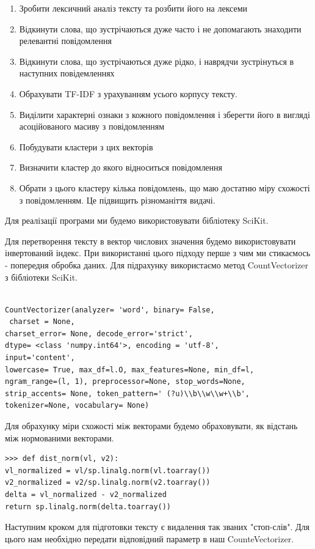 \documentclass[a4paper,14pt,russian]{extreport}
\begin{document}
\begin{enumerate}
\item Зробити лексичний аналіз тексту та розбити його на лексеми
\item Відкинути слова, що зустрічаються дуже часто і не допомагають знаходити релевантні повідомлення
\item Відкинути слова, що зустрічаються дуже рідко, і наврядчи зустрінуться в наступних повідемленнях
\item Обрахувати  TF-IDF з урахуванням усього корпусу тексту.
\item Виділити характерні ознаки з кожного повідомлення і зберегти його в вигляді асоційованого масиву з повідомленням 
\item Побудувати кластери з цих векторів
\item Визначити кластер до якого відноситься повідомлення
\item Обрати з цього кластеру кілька повідомлень, що маю достатню міру схожості з повідомленням. Це підвищить різноманіття видачі.
\end{enumerate}

Для реалізації програми ми будемо використовувати бібліотеку SciKit.

\par 
Для перетворення тексту в вектор числових значення будемо використовувати  інвертований індекс. При використанні цього підходу перше з чим ми стикаємось -  попередня обробка даних. Для підрахунку використаємо метод CountVectorizer з бібліотеки SciKit. 

\begin{lstlisting}[frame=single]  % Start your code-block

CountVectorizer(analyzer= 'word', binary= False,
 charset = None,
charset_error= None, decode_error='strict',
dtype= <class 'numpy.int64'>, encoding = 'utf-8',
input='content',
lowercase= True, max_df=l.O, max_features=None, min_df=l,
ngram_range=(l, 1), preprocessor=None, stop_words=None,
strip_accents= None, token_pattern=' (?u)\\b\\w\\w+\\b',
tokenizer=None, vocabulary= None)
\end{lstlisting}

Для обрахунку міри схожості між векторами будемо обраховувати, як відстань між нормованими векторами.

\begin{lstlisting}[frame=single]  
>>> def dist_norm(vl, v2):
vl_normalized = vl/sp.linalg.norm(vl.toarray())
v2_normalized = v2/sp.linalg.norm(v2.toarray())
delta = vl_normalized - v2_normalized
return sp.linalg.norm(delta.toarray())
\end{lstlisting}
\par 
Наступним кроком для підготовки тексту є видалення так званих "стоп-слів". Для цього нам необхідно передати відповідний параметр в наш CounteVectorizer.
\end{document}
